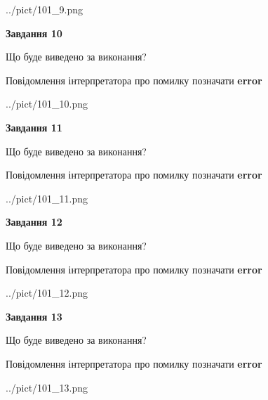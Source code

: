 \documentclass[11pt, ukrainian]{article}
\begin{document}
{\begin {large}
\begin{center}
	{../pict/101_9.png}
\end{center}
\newpage

{\begin {center}\textbf{Завдання 10}\end {center}}\par
Що буде виведено за виконання? \par
Повідомлення інтерпретатора про помилку позначати \textbf{error}

\begin{center}
	{../pict/101_10.png}
\end{center}
\newpage

{\begin {center}\textbf{Завдання 11}\end {center}}\par
Що буде виведено за виконання? \par
Повідомлення інтерпретатора про помилку позначати \textbf{error}

\begin{center}
	{../pict/101_11.png}
\end{center}
\newpage

{\begin {center}\textbf{Завдання 12}\end {center}}\par
Що буде виведено за виконання? \par
Повідомлення інтерпретатора про помилку позначати \textbf{error}

\begin{center}
	{../pict/101_12.png}
\end{center}
\newpage

{\begin {center}\textbf{Завдання 13}\end {center}}\par
Що буде виведено за виконання? \par
Повідомлення інтерпретатора про помилку позначати \textbf{error}

\begin{center}
	{../pict/101_13.png}
\end{center}
\newpage


\end{large}}
\end{document}
